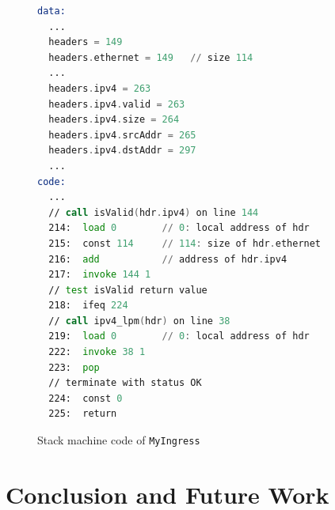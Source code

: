 \documentclass[sigconf]{acmart}
\begin{document}
  \begin{figure}
  \begin{lstlisting}[language=asm]
data:
  ...
  headers = 149 
  headers.ethernet = 149   // size 114
  ...
  headers.ipv4 = 263 
  headers.ipv4.valid = 263 
  headers.ipv4.size = 264 
  headers.ipv4.srcAddr = 265 
  headers.ipv4.dstAddr = 297
  ...
code:
  ...
  // call isValid(hdr.ipv4) on line 144
  214:  load 0	      // 0: local address of hdr
  215:  const 114     // 114: size of hdr.ethernet
  216:  add           // address of hdr.ipv4
  217:  invoke 144 1		 
  // test isValid return value
  218:  ifeq 224		 
  // call ipv4_lpm(hdr) on line 38
  219:  load 0        // 0: local address of hdr
  222:  invoke 38 1		 
  223:  pop
  // terminate with status OK
  224:  const 0		 
  225:  return 
\end{lstlisting}
\caption{Stack machine code of \texttt{MyIngress}}
  \label{code:stack}
\end{figure}
  
	\section{Conclusion and Future Work} %
\end{document}
